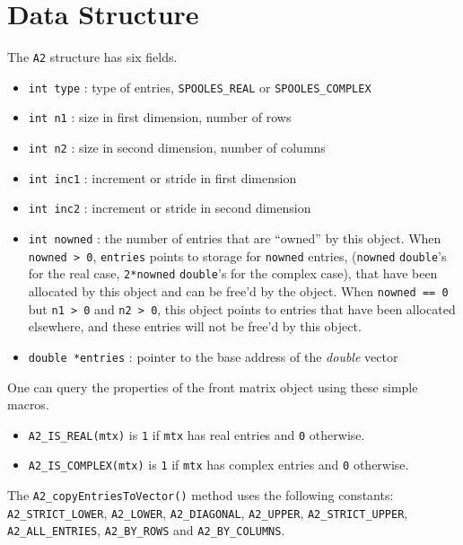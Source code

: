 \par
\section{Data Structure}
\label{section:A2:dataStructure}
\par
\par
The {\tt A2} structure has six fields.
\begin{itemize}
\item
{\tt int type} : type of entries,
{\tt SPOOLES\_REAL} or {\tt SPOOLES\_COMPLEX}
\item
{\tt int n1} : size in first dimension, number of rows
\item
{\tt int n2} : size in second dimension, number of columns
\item
{\tt int inc1} : increment or stride in first dimension
\item
{\tt int inc2} : increment or stride in second dimension
\item
{\tt int nowned} : the number of entries that are ``owned'' by this
object. 
When {\tt nowned > 0}, 
{\tt entries} points to storage for {\tt nowned} entries,
({\tt nowned} {\tt double}'s for the real case,
{\tt 2*nowned} {\tt double}'s for the complex case),
that have been allocated by this object and can be free'd by the object.
When {\tt nowned == 0} but {\tt n1 > 0} and {\tt n2 > 0}, 
this object points to entries that have been allocated elsewhere, 
and these entries will not be free'd by this object.
\item
{\tt double *entries} : 
pointer to the base address of the {\it double} vector
\end{itemize}
One can query the properties of the front matrix object 
using these simple macros.
\begin{itemize}
\item
{\tt A2\_IS\_REAL(mtx)} is {\tt 1} if {\tt mtx} 
has real entries and {\tt 0} otherwise.
\item
{\tt A2\_IS\_COMPLEX(mtx)} is {\tt 1} if {\tt mtx} 
has complex entries and {\tt 0} otherwise.
\end{itemize}
The {\tt A2\_copyEntriesToVector()} method
uses the following constants: 
{\tt A2\_STRICT\_LOWER},
{\tt A2\_LOWER},
{\tt A2\_DIAGONAL},
{\tt A2\_UPPER},
{\tt A2\_STRICT\_UPPER},
{\tt A2\_ALL\_ENTRIES},
{\tt A2\_BY\_ROWS} and
{\tt A2\_BY\_COLUMNS}.

